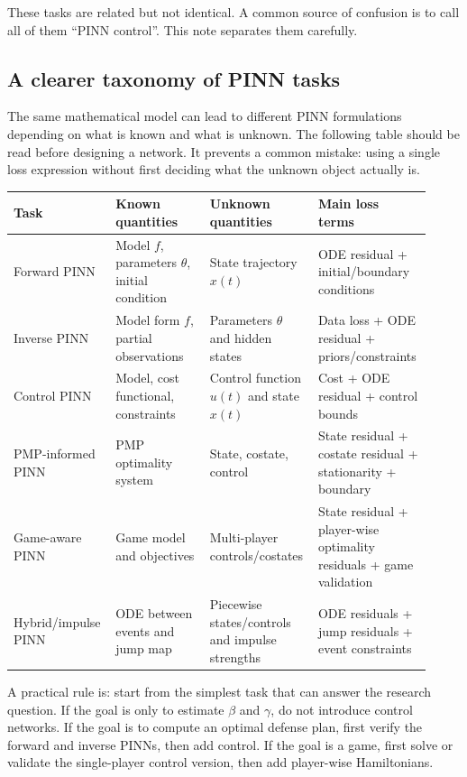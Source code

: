 \documentclass[11pt,a4paper]{article}
\begin{document}
These tasks are related but not identical. A common source of confusion is to call all of them ``PINN control''. This note separates them carefully.

\subsection{A clearer taxonomy of PINN tasks}
The same mathematical model can lead to different PINN formulations depending on what is known and what is unknown. The following table should be read before designing a network. It prevents a common mistake: using a single loss expression without first deciding what the unknown object actually is.

\begin{longtable}{p{0.22\linewidth}p{0.22\linewidth}p{0.24\linewidth}p{0.24\linewidth}}
\toprule
Task & Known quantities & Unknown quantities & Main loss terms \\
\midrule
Forward PINN & Model $f$, parameters $\theta$, initial condition & State trajectory $x(t)$ & ODE residual + initial/boundary conditions \\
Inverse PINN & Model form $f$, partial observations & Parameters $\theta$ and hidden states & Data loss + ODE residual + priors/constraints \\
Control PINN & Model, cost functional, constraints & Control function $u(t)$ and state $x(t)$ & Cost + ODE residual + control bounds \\
PMP-informed PINN & PMP optimality system & State, costate, control & State residual + costate residual + stationarity + boundary \\
Game-aware PINN & Game model and objectives & Multi-player controls/costates & State residual + player-wise optimality residuals + game validation \\
Hybrid/impulse PINN & ODE between events and jump map & Piecewise states/controls and impulse strengths & ODE residuals + jump residuals + event constraints \\
\bottomrule
\end{longtable}

A practical rule is: start from the simplest task that can answer the research question. If the goal is only to estimate $\beta$ and $\gamma$, do not introduce control networks. If the goal is to compute an optimal defense plan, first verify the forward and inverse PINNs, then add control. If the goal is a game, first solve or validate the single-player control version, then add player-wise Hamiltonians.
\end{document}

